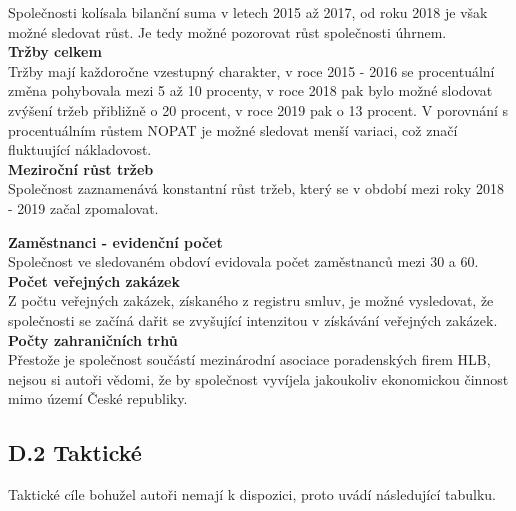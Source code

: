 Společnosti kolísala bilanční suma v letech 2015 až 2017, od roku 2018 je však možné sledovat růst. Je tedy možné pozorovat růst společnosti úhrnem.\\

\noindent\textbf{Tržby celkem}\\

Tržby mají každoročne vzestupný charakter, v roce 2015 - 2016 se procentuální změna pohybovala mezi 5 až 10 procenty, v roce 2018 pak bylo možné slodovat zvýšení tržeb přibližně o 20 procent, v roce 2019 pak o 13 procent. V porovnání s procentuálním růstem NOPAT je možné sledovat menší variaci, což značí fluktuující nákladovost.\\

\noindent\textbf{Meziroční růst tržeb}\\

Společnost zaznamenává konstantní růst tržeb, který se v období mezi roky 2018 - 2019 začal zpomalovat.\\

\newpage

\noindent\textbf{Zaměstnanci - evidenční počet}\\

Společnost ve sledovaném obdoví evidovala počet zaměstnanců mezi 30 a 60.\\

\noindent\textbf{Počet veřejných zakázek}\\

Z počtu veřejných zakázek, získaného z registru smluv, je možné vysledovat, že společnosti se začíná dařit se zvyšující intenzitou v získávání veřejných zakázek.\\

\noindent\textbf{Počty zahraničních trhů}\\

Přestože je společnost součástí mezinárodní asociace poradenských firem HLB, nejsou si autoři vědomi, že by společnost vyvíjela jakoukoliv ekonomickou činnost mimo území České republiky.\\

\subsection*{D.2 Taktické}
\label{sec:Takticke}

Taktické cíle bohužel autoři nemají k dispozici, proto uvádí následující tabulku.\\

